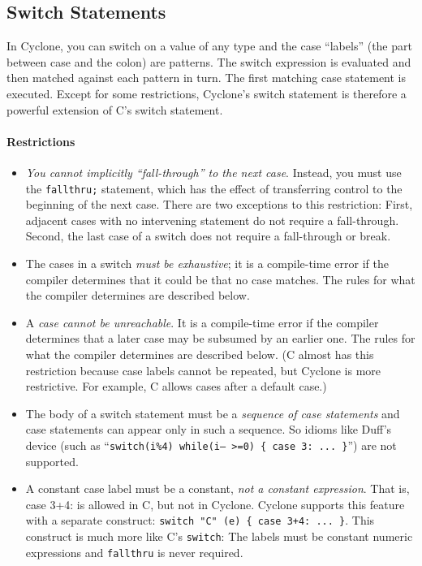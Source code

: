 \subsection{Switch Statements}\hypertarget{switch_stmt}{}

In Cyclone, you can switch on a value of any type and the case
``labels'' (the part between case and the colon) are patterns.  The
switch expression is evaluated and then matched against each pattern
in turn.  The first matching case statement is executed.  Except for
some restrictions, Cyclone's switch statement is therefore a powerful
extension of C's switch statement.

\paragraph{Restrictions}
\begin{itemize}
\item \emph{You cannot implicitly ``fall-through'' to the next case}.
  Instead, you must use the \texttt{fallthru;} statement, which has
  the effect of transferring control to the beginning of the next
  case.  There are two exceptions to this restriction:  First, adjacent
  cases with no intervening statement do not require a fall-through.
  Second, the last case of a switch does not require a fall-through
  or break.
\item The cases in a switch \emph{must be exhaustive}; it is a
  compile-time error if the compiler determines that it could be that
  no case matches.  The rules for what the compiler determines are
  described below.
\item A \emph{case cannot be unreachable}.  It is a compile-time error
  if the compiler determines that a later case may be subsumed by an
  earlier one.  The rules for what the compiler determines are
  described below.  (C almost has this restriction because case labels
  cannot be repeated, but Cyclone is more restrictive.  For example, C
  allows cases after a default case.)
\item The body of a switch statement must be a \emph{sequence of case
    statements} and case statements can appear only in such a
  sequence. So idioms like Duff's device
  (such as ``\texttt{switch(i\%4) while(i-- >=0) \{ case 3: ... \}}'')
  are not supported.
\item A constant case label must be a constant, \emph{not a constant
    expression}.  That is, case 3+4: is allowed in C, but not in
  Cyclone.  Cyclone supports this feature with a separate construct:
  \texttt{switch "C" (e) \{ case 3+4: ... \}}.  This construct is much
  more like C's \texttt{switch}: The labels must be constant
  numeric expressions and \texttt{fallthru} is never required.
\end{itemize}


